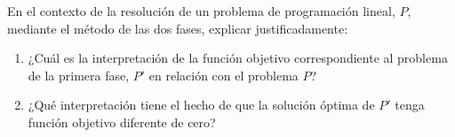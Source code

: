 En el contexto de la resolución de un problema de programación  lineal, $P$, mediante el método de las dos fases, explicar justificadamente:
\begin{enumerate}
    \item ¿Cuál es la interpretación de la función objetivo correspondiente al problema de la primera fase, $P'$ en relación con el problema $P$?
    \item ¿Qué interpretación tiene el hecho de que la solución óptima de $P'$ tenga función objetivo diferente de cero?
\end{enumerate}